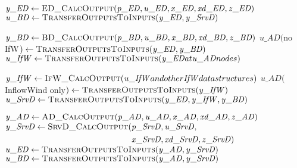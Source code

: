 \documentclass[10pt,letterpaper,oneside,notitlepage]{article}
\begin{document}
\begin{algorithmic}[1]

\State
   \State $\mathit{y\_ED} \gets \Call{ED\_CalcOutput}{\mathit{p\_ED},\mathit{u\_ED},\mathit{x\_ED},\mathit{xd\_ED},\mathit{z\_ED}}$
   \State $\mathit{u\_BD}  \gets \Call{TransferOutputsToInputs}{\mathit{y\_ED,y\_SrvD}}$

\State
   \State $\mathit{y\_BD} \gets \Call{BD\_CalcOutput}{\mathit{p\_BD},\mathit{u\_BD},\mathit{x\_BD},\mathit{xd\_BD},\mathit{z\_BD}}$
   \State $\mathit{u\_AD}($no IfW$)  \gets \Call{TransferOutputsToInputs}{\mathit{y\_ED,y\_BD}}$
   \State $\mathit{u\_IfW} \gets \Call{TransferOutputsToInputs}{\mathit{y\_ED} at \mathit{u\_AD} nodes}$

\State
   \State $\mathit{y\_IfW} \gets \Call{IfW\_CalcOutput}{\mathit{u\_IfW} and other \mathit{IfW} data structures}$
   \State $\mathit{u\_AD}($InflowWind only$) \gets \Call{TransferOutputsToInputs}{\mathit{y\_IfW}}$
   \State $\mathit{u\_SrvD} \gets \Call{TransferOutputsToInputs}{\mathit{y\_ED},\mathit{y\_IfW},\mathit{y\_BD}}$

\State
   \State $\mathit{y\_AD} \gets \Call{AD\_CalcOutput}{\mathit{p\_AD},\mathit{u\_AD},\mathit{x\_AD},\mathit{xd\_AD},\mathit{z\_AD}}$
   \State $\mathit{y\_SrvD} \gets \Call{SrvD\_CalcOutput}{}( \!
            \begin{aligned}[t]
                               & \mathit{p\_SrvD},\mathit{u\_SrvD}, \\
                               & \mathit{x\_SrvD},\mathit{xd\_SrvD},\mathit{z\_SrvD}) \\
            \end{aligned}$
   \State $\mathit{u\_ED} \gets \Call{TransferOutputsToInputs}{\mathit{y\_AD},\mathit{y\_SrvD}}$
   \State $\mathit{u\_BD} \gets \Call{TransferOutputsToInputs}{\mathit{y\_AD,y\_SrvD}}$

\State


\end{algorithmic}
\end{document}
